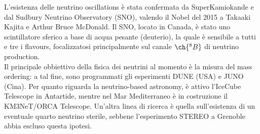 L'esistenza delle neutrino oscillations è stata confermata da SuperKamiokande e dal Sudbury Neutrino Observatory (SNO), valendo il Nobel del 2015 a Takaaki Kajita e Arthur Bruce McDonald. Il SNO, locato in Canada, è stato uno scintillatore sferico a base di acqua pesante (deuterio), la quale è sensibile a tutti e tre i flavours, focalizzatosi principalmente sul canale $ \ch{^8B} $ di neutrino production.\\
Il principale obbiettivo della fisica dei neutrini al momento è la misura del mass ordering: a tal fine, sono programmati gli esperimenti DUNE (USA) e JUNO (Cina). Per quanto riguarda la neutrino-based astronomy, è attivo l'IceCube Telescope in Antartide, mentre nel Mar Mediterraneo è in costruzione il KM3NeT/ORCA Telescope. Un'altra linea di ricerca è quella sull'esistenza di un eventuale quarto neutrino sterile, sebbene l'esperimento STEREO a Grenoble abbia escluso questa ipotesi.











